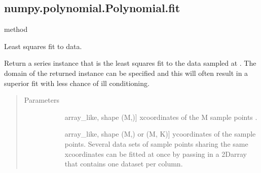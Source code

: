 \documentclass[letterpaper,10pt,english]{sphinxmanual}
\begin{document}
\begin{fulllineitems}
\begin{fulllineitems}
\begin{quote}
\begin{description}
\begin{description}
\end{description}

\end{description}\end{quote}

\end{fulllineitems}



\subsection{numpy.polynomial.Polynomial.fit}
\label{\detokenize{generated/generated/numpy.polynomial.Polynomial.fit:numpy-polynomial-polynomial-fit}}\label{\detokenize{generated/generated/numpy.polynomial.Polynomial.fit::doc}}
method

\begin{fulllineitems}
\label{\detokenize{generated/generated/numpy.polynomial.Polynomial.fit:numpy.polynomial.Polynomial.fit}}
Least squares fit to data.

Return a series instance that is the least squares fit to the data
 sampled at . The domain of the returned instance can be
specified and this will often result in a superior fit with less
chance of ill conditioning.
\begin{quote}\begin{description}
\item[{Parameters}] \leavevmode\begin{description}
\item[{}] \leavevmode{[}array\_like, shape (M,){]}
x\sphinxhyphen{}coordinates of the M sample points .

\item[{}] \leavevmode{[}array\_like, shape (M,) or (M, K){]}
y\sphinxhyphen{}coordinates of the sample points. Several data sets of sample
points sharing the same x\sphinxhyphen{}coordinates can be fitted at once by
passing in a 2D\sphinxhyphen{}array that contains one dataset per column.


\end{description}
\end{description}
\end{quote}
\end{fulllineitems}
\end{fulllineitems}
\end{document}
